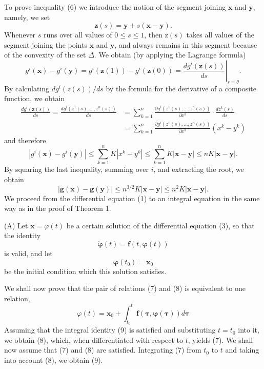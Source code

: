 \documentclass[10pt,a5paper]{book}
\theoremstyle{plain}
\theoremstyle{definition}
\theoremstyle{remark}
\begin{document}
To prove inequality (6) we introduce the notion of the segment joining $\mathbf{x}$ and $\mathbf{y}$, namely, we set
\[
\mathbf{z}(s)=\mathbf{y}+s(\mathbf{x}-\mathbf{y}) .
\]
Whenever $s$ runs over all values of $0 \leq s \leq 1$, then $\mathrm{z}(s)$ takes all values of the segment joining the points $\mathbf{x}$ and $\mathbf{y}$, and always remains in this segment because of the convexity of the set $\Delta$. We obtain (by applying the Lagrange formula)
\[
g^{i}(\mathbf{x})-g^{i}(\mathbf{y})=g^{i}(\mathbf{z}(1))-g^{i}(\mathbf{z}(0))=\left.\frac{d g^{i}(\mathbf{z}(s))}{d s}\right|_{s=\theta} .
\]
By calculating $d g^{i}(z(s)) / d s$ by the formula for the derivative of a composite function, we obtain
\[
\begin{aligned}
\frac{d g^{i}(\mathbf{z}(s))}{d s}=\frac{d g^{i}\left(z^{1}(s), \ldots, z^{n}(s)\right)}{d s} & =\sum_{k=1}^{n} \frac{\partial g^{i}\left(z^{1}(s), \ldots, z^{n}(s)\right)}{\partial x^{k}} \cdot \frac{d z^{k}(s)}{d s} \\
& =\sum_{k=1}^{n} \frac{\partial g^{i}\left(z^{1}(s), \ldots, z^{n}(s)\right)}{\partial x^{k}}\left(x^{k}-y^{k}\right)
\end{aligned}
\]
and therefore
\[
\left|g^{i}(\mathbf{x})-g^{i}(\mathbf{y})\right| \leq \sum_{k=1}^{n} K\left|x^{k}-y^{k}\right| \leq \sum_{k=1}^{n} K|\mathbf{x}-\mathbf{y}| \leq n K|\mathbf{x}-\mathbf{y}| .
\]
By squaring the last inequality, summing over $i$, and extracting the root, we obtain
\[
|\mathbf{g}(\mathbf{x})-\mathbf{g}(\mathbf{y})| \leq n^{3 / 2} K|\mathbf{x}-\mathbf{y}| \leq n^{2} K|\mathbf{x}-\mathbf{y}| .
\]
We proceed from the differential equation (1) to an integral equation in the same way as in the proof of Theorem 1.

(A) Let $\mathbf{x}=\varphi(t)$ be a certain solution of the differential equation (3), so that the identity
\begin{equation*}
\dot{\boldsymbol{\varphi}}(t)=\mathbf{f}(t, \boldsymbol{\varphi}(t)) \tag{7}
\end{equation*}
is valid, and let
\begin{equation*}
\boldsymbol{\varphi}\left(t_{0}\right)=\mathbf{x}_{0} \tag{8}
\end{equation*}
be the initial condition which this solution satisfies.

We shall now prove that the pair of relations (7) and (8) is equivalent to one relation,
\begin{equation*}
\varphi(t)=\mathbf{x}_{0}+\int_{t_{0}}^{t} \mathbf{f}(\boldsymbol{\tau}, \boldsymbol{\varphi}(\boldsymbol{\tau})) d \boldsymbol{\tau} \tag{9}
\end{equation*}
Assuming that the integral identity (9) is satisfied and substituting $t=t_{0}$ into it, we obtain (8), which, when differentiated with respect to $t$, yields (7). We shall now assume that (7) and (8) are satisfied. Integrating (7) from $t_{0}$ to $t$ and taking into account (8), we obtain (9).
\end{document}
